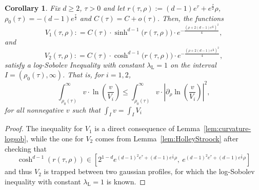 \documentclass[12pt,longbibliography]{article}
\def\lambdaL{\lambda_{\mathrm{L}}}
\newtheorem{cor}[thm]{Corollary}
\theoremstyle{definition}
\theoremstyle{remark}
\theoremstyle{example}
\begin{document}
\begin{cor}\label{cor:log_sobolev}
	Fix $d\geq 2$, $\tau>0$ and let $r(\tau, \rho):= (d-1)e^\tau + e^\frac{\tau}{2}\rho$, $\rho_0(\tau) = -(d-1)e^\frac{\tau}{2}$ and $C(\tau)= C+o(\tau)$. Then, the functions
	\[
	V_1(\tau, \rho): = C(\tau)\cdot \sinh^{d-1}\big(r(\tau, \rho)\big)\cdot e^{- \frac{\left(\rho + 2(d-1)e^\frac{\tau}{2}\right)^2}{4}},
	\]
	and
	\[
	V_2(\tau, \rho): = C(\tau)\cdot \cosh^{d-1}\big(r(\tau, \rho)\big)\cdot e^{- \frac{\left(\rho + 2(d-1)e^\frac{\tau}{2}\right)^2}{4}},
	\]
	satisfy a log-Sobolev Inequality with constant $\lambdaL= 1$ on the interval $I=(\rho_0(\tau), \infty)$. That is, for $i=1, 2$,
	\[
	\int_{\rho_0(\tau)}^\infty v \cdot\ln\left(\frac{v}{V_i}\right) \leq \int_{\rho_0(\tau)}^\infty v \cdot\left|\partial_\rho\ln\left(\frac{v}{V_i}\right)\right|^2,
	\]
	for all nonnegative $v$ such that $\int_I v = \int_I V_i$
\end{cor}
\begin{proof}
	The inequality for $V_1$ is a direct consequence of Lemma~\ref{lem:curvature-logsob}, while the one for $V_2$ comes from Lemma~\ref{lem:HolleyStroock} after checking that
	\[
	\cosh^{d-1}(r(\tau,\rho))\in \left[2^{1-d}e^{(d-1)^2e^\tau + (d-1)e^\frac{\tau}{2}\rho} ,\ e^{(d-1)^2e^\tau + (d-1)e^\frac{\tau}{2}\rho}\right]
	\]
	and thus $V_2$ is trapped between two gaussian profiles, for which the log-Sobolev inequality with constant $\lambdaL=1$ is known.
\end{proof}
\end{document}
